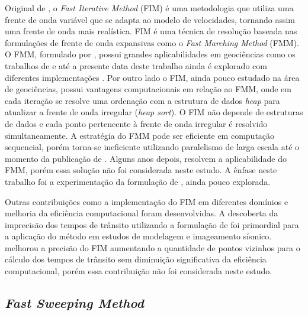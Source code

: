 Original de , o \textit{Fast Iterative Method} (FIM) é uma metodologia que utiliza uma frente de onda variável que se adapta ao modelo de velocidades, tornando assim uma frente de onda mais realística. FIM é uma técnica de resolução baseada nas formulações de frente de onda expansivas como o \textit{Fast Marching Method} (FMM). O FMM, formulado por , possui grandes aplicabilidades em geociências como os trabalhos de  e até a presente data deste trabalho ainda é explorado com diferentes implementações \cite{white2020pykonal, chenpyekfmm2023}. Por outro lado o FIM, ainda pouco estudado na área de geociências, possui vantagens computacionais em relação ao FMM, onde em cada iteração se resolve uma ordenação com a estrutura de dados \textit{heap} para atualizar a frente de onda irregular (\textit{heap sort}). O FIM não depende de estruturas de dados e cada ponto pertencente à frente de onda irregular é resolvido simultaneamente. A estratégia do FMM pode ser eficiente em computação sequencial, porém torna-se ineficiente utilizando paralelismo de larga escala até o momento da publicação de . Alguns anos depois,  resolvem a aplicabilidade do FMM, porém essa solução não foi considerada neste estudo. A ênfase neste trabalho foi a experimentação da formulação de , ainda pouco explorada. 

Outras contribuições como a implementação do FIM em diferentes domínios \cite{fu2011fast, fu2013fast} e melhoria da eficiência computacional \cite{dang2014fast, hong2016multi, hong2022mg} foram desenvolvidas. A descoberta da imprecisão dos tempos de trânsito utilizando a formulação de  foi primordial para a aplicação do método em estudos de modelagem e imageamento sísmico.  melhorou a precisão do FIM aumentando a quantidade de pontos vizinhos para o cálculo dos tempos de trânsito sem diminuição significativa da eficiência computacional, porém essa contribuição não foi considerada neste estudo.  
       







\subsection*{\textit{Fast Sweeping Method}}

